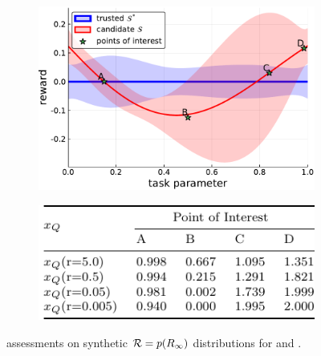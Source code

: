 \begin{figure}[tbp]
    \centering
    \begin{subfigure}[c]{0.6\linewidth}
        \centering
        \includegraphics[width=0.7\linewidth]{Figures/p1.pdf}
        \vfill
    \end{subfigure}%
    \hfill
    \begin{subfigure}[t]{0.35\linewidth}
        \centering
        \includegraphics[width=1.0\linewidth]{Figures/p1_table.pdf}
    \end{subfigure} 
    \caption{\xQ{} assessments on synthetic $\mathcal{R}=p(R_{\infty})$ distributions for \solvetrust{} and \solve{}.} %
    \label{fig:sq_thry1}
\end{figure}
